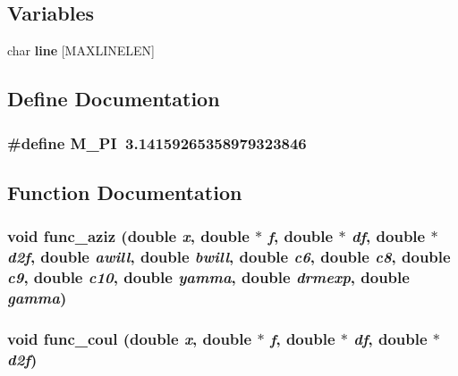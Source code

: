 \subsection*{Variables}
\begin{CompactItemize}
\item 
char {\bf line} [MAXLINELEN]
\end{CompactItemize}


\subsection{Define Documentation}
\subsubsection{\setlength{\rightskip}{0pt plus 5cm}\#define M\_\-PI~3.14159265358979323846}\label{test_2dzug_2md__funcvdw_8c_e71449b1cc6e6250b91f539153a7a0d3}




\subsection{Function Documentation}
\subsubsection{\setlength{\rightskip}{0pt plus 5cm}void func\_\-aziz (double {\em x}, double $\ast$ {\em f}, double $\ast$ {\em df}, double $\ast$ {\em d2f}, double {\em awill}, double {\em bwill}, double {\em c6}, double {\em c8}, double {\em c9}, double {\em c10}, double {\em yamma}, double {\em drmexp}, double {\em gamma})}\label{test_2dzug_2md__funcvdw_8c_64c66ef88f0a9d62bfc635112ed01b9f}


\subsubsection{\setlength{\rightskip}{0pt plus 5cm}void func\_\-coul (double {\em x}, double $\ast$ {\em f}, double $\ast$ {\em df}, double $\ast$ {\em d2f})}\label{test_2dzug_2md__funcvdw_8c_ea71c8b471297028f0aa05c24a0a539d}


